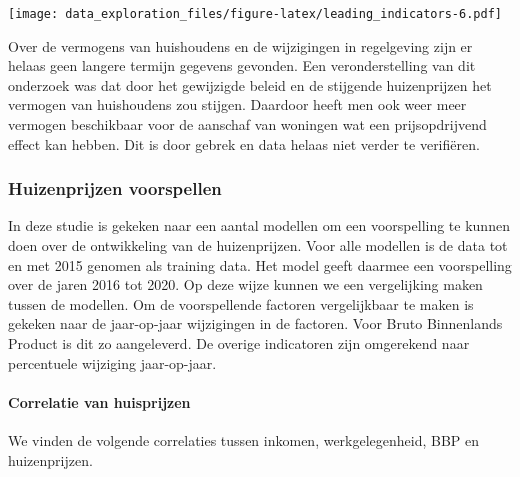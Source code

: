 \documentclass[
]{article}
\begin{document}
\texttt{[image: data\_exploration\_files/figure-latex/leading\_indicators-6.pdf]}

Over de vermogens van huishoudens en de wijzigingen in regelgeving zijn
er helaas geen langere termijn gegevens gevonden. Een veronderstelling
van dit onderzoek was dat door het gewijzigde beleid en de stijgende
huizenprijzen het vermogen van huishoudens zou stijgen. Daardoor heeft
men ook weer meer vermogen beschikbaar voor de aanschaf van woningen wat
een prijsopdrijvend effect kan hebben. Dit is door gebrek en data helaas
niet verder te verifiëren.

\hypertarget{huizenprijzen-voorspellen}{%
\subsubsection{Huizenprijzen
voorspellen}\label{huizenprijzen-voorspellen}}

In deze studie is gekeken naar een aantal modellen om een voorspelling
te kunnen doen over de ontwikkeling van de huizenprijzen. Voor alle
modellen is de data tot en met 2015 genomen als training data. Het model
geeft daarmee een voorspelling over de jaren 2016 tot 2020. Op deze
wijze kunnen we een vergelijking maken tussen de modellen. Om de
voorspellende factoren vergelijkbaar te maken is gekeken naar de
jaar-op-jaar wijzigingen in de factoren. Voor Bruto Binnenlands Product
is dit zo aangeleverd. De overige indicatoren zijn omgerekend naar
percentuele wijziging jaar-op-jaar.

\hypertarget{correlatie-van-huisprijzen}{%
\paragraph{Correlatie van
huisprijzen}\label{correlatie-van-huisprijzen}}

We vinden de volgende correlaties tussen inkomen, werkgelegenheid, BBP
en huizenprijzen.
\end{document}
